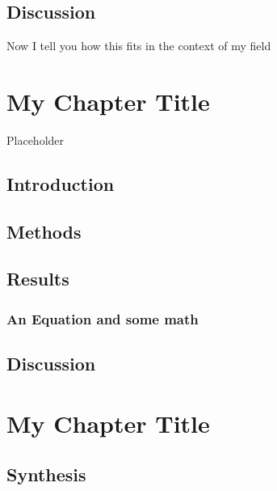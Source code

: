 \documentclass[
  10pt,
]{report}
\begin{document}
\hypertarget{discussion}{%
\section{Discussion}\label{discussion}}

Now I tell you how this fits in the context of my field

\hypertarget{my-chapter-title}{%
\chapter{My Chapter Title}\label{my-chapter-title}}

Placeholder

\hypertarget{introduction-1}{%
\section{Introduction}\label{introduction-1}}

\hypertarget{methods-1}{%
\section{Methods}\label{methods-1}}

\hypertarget{results-1}{%
\section{Results}\label{results-1}}

\hypertarget{an-equation-and-some-math}{%
\subsection{An Equation and some math}\label{an-equation-and-some-math}}

\hypertarget{discussion-1}{%
\section{Discussion}\label{discussion-1}}

\hypertarget{my-chapter-title-1}{%
\chapter{My Chapter Title}\label{my-chapter-title-1}}

\hypertarget{synthesis}{%
\section{Synthesis}\label{synthesis}}
\end{document}
